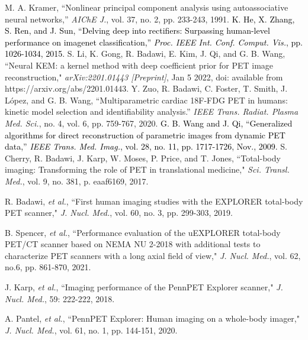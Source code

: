 \documentclass[]{IEEETran}
\newcommand{\txtb}[1]{\textcolor{black}{#1}}
\begin{document}
\begin{thebibliography}{00}
		 M. A. Kramer, ``Nonlinear principal component analysis using autoassociative neural networks,'' \emph{AIChE J.}, vol. 37, no. 2, pp. 233-243, 1991.
		 \txtb{K. He, X. Zhang, S. Ren, and J. Sun, ``Delving deep into rectifiers: Surpassing human-level performance on imagenet classification,'' \emph{Proc. IEEE Int. Conf. Comput. Vis.}, pp. 1026-1034, 2015.}
		 S. Li, K. Gong, R. Badawi, E. Kim, J. Qi, and G. B. Wang, ``Neural KEM: a kernel method with deep coefficient prior for PET image reconstruction," \emph{arXiv:2201.01443 [Preprint]}, Jan 5 2022, doi: available from https://arxiv.org/abs/2201.01443.
		 Y. Zuo, R. Badawi, C. Foster, T. Smith, J. López, and G. B. Wang,
		``Multiparametric cardiac 18F-FDG PET in humans: kinetic model selection and identifiability analysis.'' \emph{IEEE Trans. Radiat. Plasma Med. Sci.}, no. 4, vol. 6, pp. 759-767, 2020.
		 \txtb{G. B. Wang and J. Qi, ``Generalized algorithms for direct reconstruction of parametric images from dynamic PET data,'' \emph{IEEE Trans. Med. Imag.}, vol. 28, no. 11, pp. 1717-1726, Nov., 2009.}
		S. Cherry, R. Badawi, J. Karp, W. Moses, P. Price, and T. Jones, ``Total-body imaging: Transforming the role of PET in translational medicine,"  \emph{Sci. Transl. Med.}, vol. 9, no. 381, p. eaaf6169, 2017.
		
		  R. Badawi, \emph{et al.},  ``First human imaging studies with the EXPLORER total-body PET scanner," 
		\emph{J. Nucl. Med.}, vol. 60, no. 3, pp. 299-303, 2019.
		
		B. Spencer, \emph{et al.}, 
		``Performance evaluation of the uEXPLORER total-body PET/CT scanner based on NEMA NU 2-2018 with additional tests to characterize PET scanners with a long axial field of view," 
		\emph{J. Nucl. Med.}, vol. 62, no.6, pp. 861-870, 2021.
		
		J. Karp, \emph{et al.}, 
		``Imaging performance of the PennPET Explorer scanner," 
		\emph{J. Nucl. Med.}, 59: 222-222, 2018.
		
		A. Pantel, \emph{et al.}, 
		``PennPET Explorer: Human imaging on a whole-body imager," 
		\emph{J. Nucl. Med.}, vol. 61, no. 1, pp. 144-151, 2020.
		
		
	\end{thebibliography}
	
\end{document}
